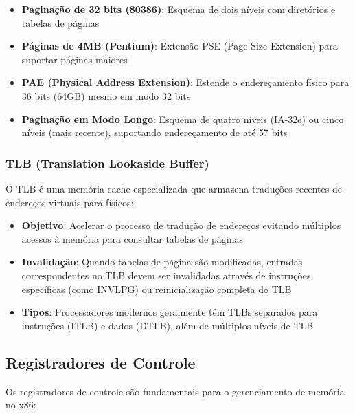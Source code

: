 \begin{itemize}
    \item \textbf{Paginação de 32 bits (80386)}: Esquema de dois níveis com diretórios e tabelas de páginas
    \item \textbf{Páginas de 4MB (Pentium)}: Extensão PSE (Page Size Extension) para suportar páginas maiores
    \item \textbf{PAE (Physical Address Extension)}: Estende o endereçamento físico para 36 bits (64GB) mesmo em modo 32 bits
    \item \textbf{Paginação em Modo Longo}: Esquema de quatro níveis (IA-32e) ou cinco níveis (mais recente), suportando endereçamento de até 57 bits
\end{itemize}

\subsubsection{TLB (Translation Lookaside Buffer)}

O TLB é uma memória cache especializada que armazena traduções recentes de endereços virtuais para físicos:

\begin{itemize}
    \item \textbf{Objetivo}: Acelerar o processo de tradução de endereços evitando múltiplos acessos à memória para consultar tabelas de páginas
    \item \textbf{Invalidação}: Quando tabelas de página são modificadas, entradas correspondentes no TLB devem ser invalidadas através de instruções específicas (como INVLPG) ou reinicialização completa do TLB
    \item \textbf{Tipos}: Processadores modernos geralmente têm TLBs separados para instruções (ITLB) e dados (DTLB), além de múltiplos níveis de TLB
\end{itemize}

\subsection{Registradores de Controle}
\label{subsec:reg_controle}

Os registradores de controle são fundamentais para o gerenciamento de memória no x86:

